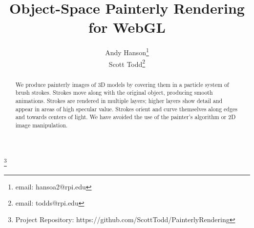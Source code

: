\documentclass[conference]{acmsiggraph}
\title{Object-Space Painterly Rendering for WebGL}
\author{Andy Hanson\thanks{email: hansoa2@rpi.edu}\\
        Scott Todd\thanks{email: todds@rpi.edu}}
\newcommand\blfootnote[1]{%
  \begingroup
  \renewcommand\thefootnote{}\footnote{#1}%
  \addtocounter{footnote}{-1}%
  \endgroup
}
\begin{document}

\maketitle


\begin{abstract}

We produce painterly images of 3D models by covering them in a particle system
of brush strokes. Strokes move along with the original object, producing smooth
animations. Strokes are rendered in multiple layers; higher layers show detail
and appear in areas of high specular value. Strokes orient and curve themselves
along edges and towards centers of light. We have avoided the use of the
painter's algorithm or 2D image manipulation.

\end{abstract}



\keywordlist


\TOGlinkslist

\blfootnote{Project Repository: https://github.com/ScottTodd/PainterlyRendering}

\copyrightspace
\end{document}
